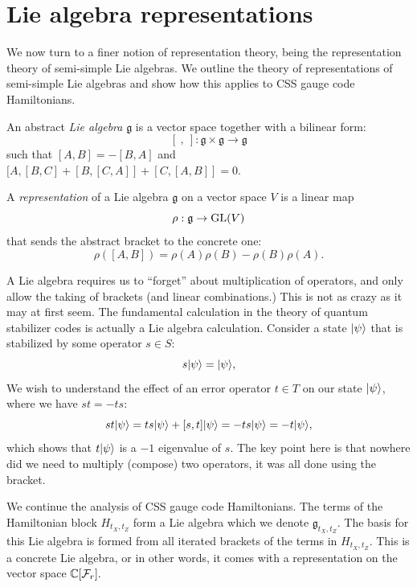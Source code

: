 %

\section{Lie algebra representations}


\def\lie{\mathfrak{g}}
\def\lieh{\mathfrak{h}}
\def\sl{\mathfrak{sl}}

We now turn to a finer notion of representation theory,
being the representation theory of semi-simple Lie algebras.
We outline the theory of representations
of semi-simple Lie algebras \cite{Fulton2013} and show
how this applies to CSS gauge code Hamiltonians.

An abstract 
\emph{Lie algebra} $\lie$ is 
a vector space together with a bilinear form:
$$
    [\ ,\  ] : \lie \times \lie \to \lie
$$
such that $[A,B] = -[B,A]$ and
$[A,[B,C]+[B,[C,A]]+[C,[A,B]]=0.$

A \emph{representation} of a Lie algebra $\lie$
on a vector space $V$ 
is a linear map
$$
    \rho : \lie \to \GL(V)
$$
that sends the abstract bracket to the concrete one:
$$
    \rho([A, B]) = \rho(A)\rho(B) - \rho(B)\rho(A).
$$

A Lie algebra requires us to ``forget'' about
multiplication of operators, and only allow the taking of brackets
(and linear combinations.)
This is not as crazy as it may at first seem.
The fundamental calculation in the theory of
quantum stabilizer codes is actually
a Lie algebra calculation.
Consider a state $|{\psi}\rangle$
that is stabilized by some operator $s\in S:$
$$
    s|{\psi}\rangle = |{\psi}\rangle,
$$
We wish to understand the effect of an error operator $t\in T$
on our state $|{\psi}\rangle$, where we have $st = -ts:$
$$
    st|{\psi}\rangle = ts|{\psi}\rangle + [s, t]|{\psi}\rangle = -ts|{\psi}\rangle = -t|{\psi}\rangle,
$$
which shows that $t|{\psi}\rangle$ is a $-1$ eigenvalue of $s.$
The key point here is that nowhere did we need to multiply (compose) two operators,
it was all done using the bracket.

We continue the analysis of CSS gauge code Hamiltonians.
The terms of the Hamiltonian block $H_{t_X,t_Z}$
form a Lie algebra which we denote $\lie_{t_X,t_Z}.$
The basis for this Lie algebra is formed from all iterated 
brackets of the terms in $H_{t_X,t_Z}.$
This is a concrete Lie algebra, or in other words, it comes
with a representation on the vector space $\mathbb{C}[\mathcal{F}_{r}].$

